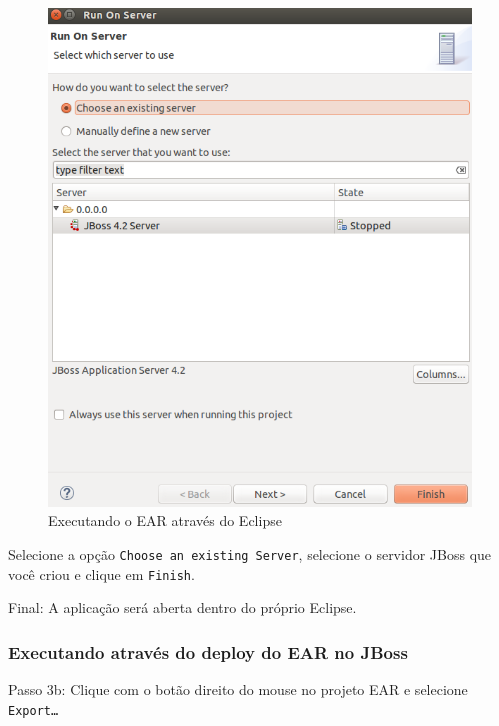 \begin{figure}[H]
	\centering
	\includegraphics[scale=0.4]{files/imgs/gwt-13.png}
	\caption{Executando o EAR através do Eclipse}
	\label{gwt13}
\end{figure}

Selecione a opção \texttt{Choose an existing Server}, selecione o servidor JBoss que você criou e clique em \texttt{Finish}.

Final: A aplicação será aberta dentro do próprio Eclipse.

\subsubsection{Executando através do deploy do EAR no JBoss}

Passo 3b: Clique com o botão direito do mouse no projeto EAR e selecione \texttt{Export\ldots}

